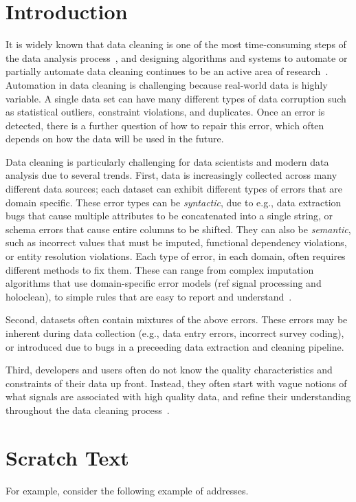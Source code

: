 \section{Introduction}\label{intro}\sloppy

It is widely known that data cleaning is one of the most time-consuming steps of the data analysis process~\cite{nytimes}, and designing algorithms and systems to automate or partially automate data cleaning continues to be an active area of research~\cite{DBLP:conf/sigmod/ChuIKW16}.
Automation in data cleaning is challenging because real-world data is highly variable. 
A single data set can have many different types of data corruption such as statistical outliers, constraint violations, and duplicates.
Once an error is detected, there is a further question of how to repair this error, which often depends on how the data will be used in the future.

Data cleaning is particularly challenging for data scientists and modern data analysis due to several trends.
First, data is increasingly collected across many different data sources; each dataset can exhibit different types of errors that are domain specific.  These error types can be {\it syntactic}, due to e.g., data extraction bugs that cause multiple attributes to be concatenated into a single string, or schema errors that cause entire columns to be shifted.  They can also be {\it semantic}, such as incorrect values that must be imputed, functional dependency violations, or entity resolution violations.   Each type of error, in each domain, often requires different methods to fix them.  These can range from complex imputation algorithms that use domain-specific error models (ref signal processing and holoclean), to simple rules that are easy to report and understand~\cite{}.  

Second, datasets often contain mixtures of the above errors.  These errors may be inherent during data collection (e.g., data entry errors, incorrect survey coding), or introduced due to bugs in a preceeding data extraction and cleaning pipeline.   

Third, developers and users often do not know the quality characteristics and constraints of their data up front.  Instead, they often start with vague notions of what signals are associated with high quality data, and refine their understanding throughout the data cleaning process~\cite{}.

\section{Scratch Text}
For example, consider the following example of addresses.

